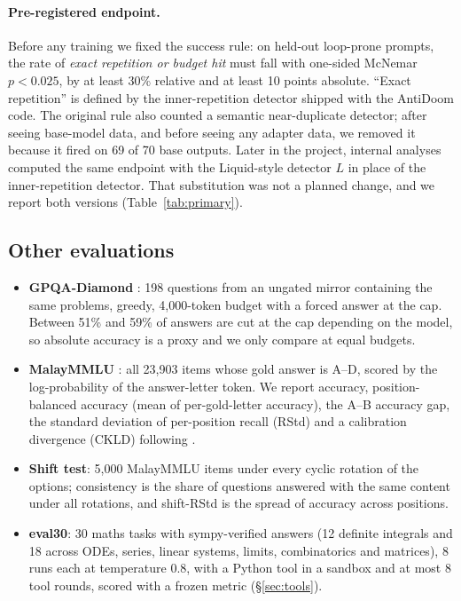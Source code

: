\documentclass[11pt]{article}
\begin{document}
\paragraph{Pre-registered endpoint.} Before any training we fixed the success rule: on held-out loop-prone prompts, the rate of \emph{exact repetition or budget hit} must fall with one-sided McNemar $p<0.025$, by at least 30\% relative and at least 10 points absolute. ``Exact repetition'' is defined by the inner-repetition detector shipped with the AntiDoom code. The original rule also counted a semantic near-duplicate detector; after seeing base-model data, and before seeing any adapter data, we removed it because it fired on 69 of 70 base outputs. Later in the project, internal analyses computed the same endpoint with the Liquid-style detector $L$ in place of the inner-repetition detector. That substitution was not a planned change, and we report both versions (Table~\ref{tab:primary}).

\subsection{Other evaluations}

\begin{itemize}
  \item \textbf{GPQA-Diamond} \citep{rein2023gpqa}: 198 questions from an ungated mirror containing the same problems, greedy, 4,000-token budget with a forced answer at the cap. Between 51\% and 59\% of answers are cut at the cap depending on the model, so absolute accuracy is a proxy and we only compare at equal budgets.
  \item \textbf{MalayMMLU} \citep{malaymmlu}: all 23,903 items whose gold answer is A--D, scored by the log-probability of the answer-letter token. We report accuracy, position-balanced accuracy (mean of per-gold-letter accuracy), the A--B accuracy gap, the standard deviation of per-position recall (RStd) and a calibration divergence (CKLD) following \citet{zheng2024pride}.
  \item \textbf{Shift test}: 5,000 MalayMMLU items under every cyclic rotation of the options; consistency is the share of questions answered with the same content under all rotations, and shift-RStd is the spread of accuracy across positions.
  \item \textbf{eval30}: 30 maths tasks with sympy-verified answers (12 definite integrals and 18 across ODEs, series, linear systems, limits, combinatorics and matrices), 8 runs each at temperature 0.8, with a Python tool in a sandbox and at most 8 tool rounds, scored with a frozen metric (\S\ref{sec:tools}).
\end{itemize}
\end{document}
